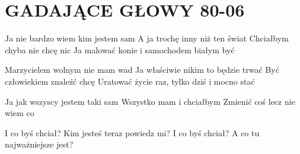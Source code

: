 \documentclass[../../../songbook.tex]{subfiles}
\begin{document}
\TabPositions{8cm} %
\section*{GADAJĄCE GŁOWY 80-06}
{}
\vspace{0.5cm}
Ja nie bardzo wiem kim jestem sam			 \newline
A ja trochę inny niż ten świat				 \newline
Chciałbym chyba nie chcę nic				 \newline
Ja malować konie i samochodem białym być 	 \newline
 
Marzycielem wolnym nie mam wad 					 \newline
Ja właściwie nikim to będzie trwać 				 \newline
Być człowiekiem znaleźć chcę  					 \newline
Uratować życie raz, tylko dziś i mocno stać 	 \newline
  
Ja jak wszyscy jestem taki sam 	 \newline
Wszystko mam i chciałbym  		 \newline
Zmienić coś lecz nie wiem co  	 \newline

\-\hspace{1cm} I co byś chciał? 				 \newline
\-\hspace{1cm} Kim jesteś teraz powiedz mi? 	 \newline
\-\hspace{1cm} I co byś chciał? 			 \newline
\-\hspace{1cm} A co tu najważniejsze jest? 	 \newline

 \newline
\end{document}

